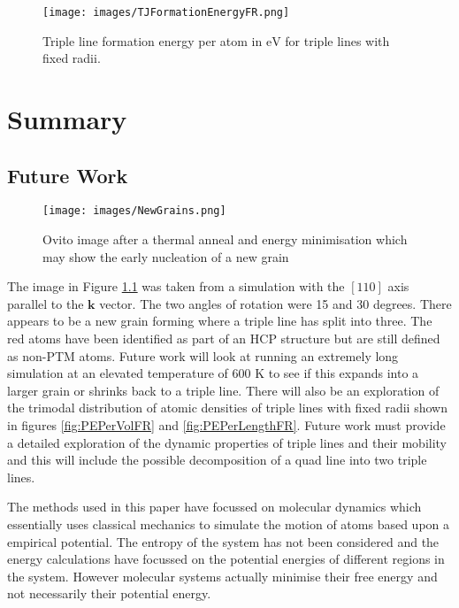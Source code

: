 \documentclass[12pt,a4paper,openany]{report}
\newcommand{\ts}[1]{\textrm{#1}}
\begin{document}
\begin{figure}[H]
	\texttt{[image: images/TJFormationEnergyFR.png]} 
	\caption{Triple line formation energy per atom in $\ts{eV}$ for triple lines with fixed radii.}
	\label{fig:FormationEnergyFR}
\end{figure}



\newpage


\chapter{Summary} \label{ch:Summary}

\section{Future Work} \label{sec:FutureWork}


\begin{figure}[H]
	\centering
	\texttt{[image: images/NewGrains.png]}
	\caption{Ovito image after a thermal anneal and energy minimisation which may show the early nucleation of a new grain}
	\label{fig:NewGrains}
\end{figure}

The image in Figure \ref{fig:NewGrains} was taken from a  simulation with the $[1 1 0]$ axis parallel to the $\mathbf{k}$ vector. The two angles of rotation were 15 and 30 degrees. There appears to be a new grain forming where a triple line has split into three. The red atoms have been identified as part of an HCP structure but are still defined as non-PTM atoms. Future work will look at running an extremely long simulation at an elevated temperature of $600$ K to see if this expands into a larger grain or shrinks back to a triple line. There will also be an exploration of the trimodal distribution of atomic densities of triple lines with fixed radii shown in figures \ref{fig:PEPerVolFR} and \ref{fig:PEPerLengthFR}. Future work must provide a detailed exploration of the dynamic properties of triple lines and their mobility and this will include the possible decomposition of a quad line into two triple lines. 
 
The methods used in this paper have focussed on molecular dynamics which essentially uses classical mechanics to simulate the motion of atoms based upon a empirical potential. The entropy of the system has not been considered and the energy calculations have focussed on the potential energies of different regions in the system. However molecular systems actually minimise their free energy and not necessarily their potential energy.  
\end{document}
